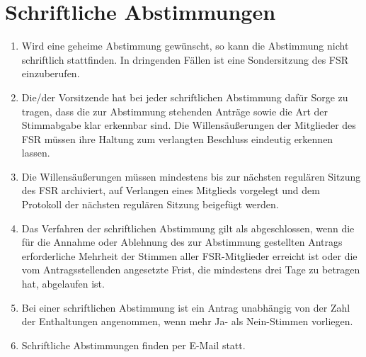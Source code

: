 \section{Schriftliche Abstimmungen}
\label{sec:schriftlich}
\begin{enumerate}
	\item Wird eine geheime Abstimmung gewünscht, so kann die Abstimmung nicht schriftlich stattfinden.
	In dringenden Fällen ist eine Sondersitzung des FSR einzuberufen.
	\item Die/der Vorsitzende hat bei jeder schriftlichen Abstimmung dafür Sorge zu tragen, dass die zur Abstimmung stehenden Anträge sowie die Art der Stimmabgabe klar erkennbar sind.
	Die Willensäußerungen der Mitglieder des FSR müssen ihre Haltung zum verlangten Beschluss eindeutig erkennen lassen.
	\item Die Willensäußerungen müssen mindestens bis zur nächsten regulären Sitzung des FSR archiviert, auf Verlangen eines Mitglieds vorgelegt und dem Protokoll der nächsten regulären Sitzung beigefügt werden.
	\item Das Verfahren
	der schriftlichen Abstimmung gilt als abgeschlossen, wenn die für die Annahme oder
	Ablehnung des zur Abstimmung gestellten Antrags erforderliche Mehrheit der Stimmen
	aller FSR-Mitglieder erreicht ist oder die vom Antragsstellenden angesetzte Frist, die
	mindestens drei Tage zu betragen hat, abgelaufen ist.
	\item Bei einer schriftlichen Abstimmung ist ein Antrag unabhängig von der Zahl der Enthaltungen angenommen, wenn mehr Ja- als Nein-Stimmen vorliegen.
	\item Schriftliche Abstimmungen finden per E-Mail statt.
\end{enumerate}

